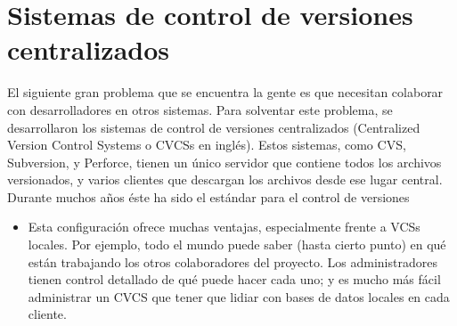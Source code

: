 \section{Sistemas de control de versiones centralizados} 
El siguiente gran problema que se encuentra la gente es que necesitan colaborar con desarrolladores en otros sistemas. Para solventar este problema, se desarrollaron los sistemas de control de versiones centralizados (Centralized Version Control Systems o CVCSs en inglés). Estos sistemas, como CVS, Subversion, y Perforce, tienen un único servidor que contiene todos los archivos versionados, y varios clientes que descargan los archivos desde ese lugar central. Durante muchos años éste ha sido el estándar para el control de versiones

\begin{itemize}
	\begin{center}
	\texttt{[image: ./Imagenes/imagen4]} 
	\end{center}

	\item Esta configuración ofrece muchas ventajas, especialmente frente a VCSs locales. Por ejemplo, todo el mundo puede saber (hasta cierto punto) en qué están trabajando los otros colaboradores del proyecto. Los administradores tienen control detallado de qué puede hacer cada uno; y es mucho más fácil administrar un CVCS que tener que lidiar con bases de datos locales en cada cliente.



\end{itemize} 